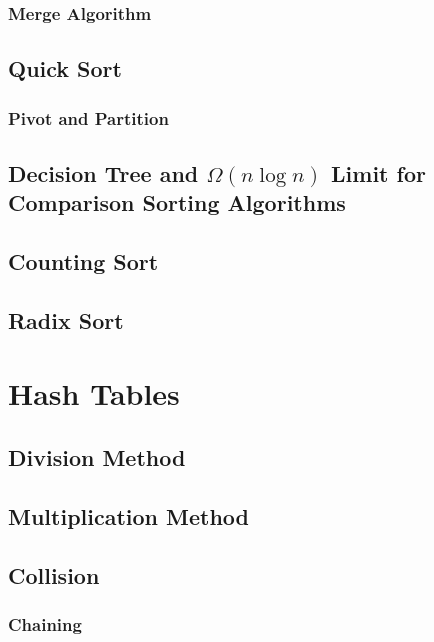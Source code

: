 \documentclass{report}
\begin{document}
\subsection{Merge Algorithm}

\section{Quick Sort}

\subsection{Pivot and Partition}

\section{Decision Tree and $\Omega{(n \log{n})}$ Limit for Comparison Sorting Algorithms}

\section{Counting Sort}

\section{Radix Sort}


\chapter{Hash Tables}

\section{Division Method}

\section{Multiplication Method}

\section{Collision}

\subsection{Chaining}
\end{document}
